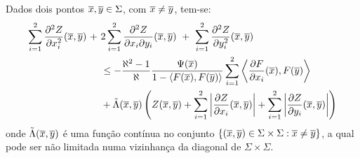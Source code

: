\begin{lema}
Dados dois pontos $\overline{x},\overline{y}\in\Sigma$, com $\overline{x}\neq\overline{y}$, tem-se:
\begin{equation} \label{eq:lema2Omegaopen}
\begin{aligned}
\sum_{i=1}^2 \frac{\partial^2 Z}{\partial x_i^2}(\xb,\yb) \ + \ & 
2 \sum_{i=1}^2 \frac{\partial^2 Z}{\partial x_i \partial y_i}(\xb,\yb) \ + \ 
\sum_{i=1}^2 \frac{\partial^2 Z}{\partial y_i^2}(\xb,\yb)  \\
& \leq
- \frac{\aleph^2 - 1}{\aleph} \frac{\Psi(\xb)}{1 - \langle F(\xb), F(\yb) \rangle} \sum_{i=1}^2 \left\langle \frac{\partial F}{\partial x_i}(\xb), F(\yb) \right\rangle \\
& + 
\tilde{\Lambda}(\xb,\yb) \left( Z(\xb,\yb) + \sum_{i=1}^2 \left| \frac{\partial Z}{\partial x_i}(\xb,\yb) \right| + \sum_{i=1}^2 \left| \frac{\partial Z}{\partial y_i}(\xb,\yb) \right| \right)
\end{aligned}
\end{equation}
onde $\tilde{\Lambda}(\overline{x},\overline{y})$ \'e uma função cont\'inua no conjunto
$\{(\overline{x},\overline{y})\in\Sigma\times\Sigma:\overline{x}\neq\overline{y} \}$, a qual pode ser não
limitada numa vizinhan\c ca da diagonal de $\Sigma\times\Sigma$.
\end{lema}
